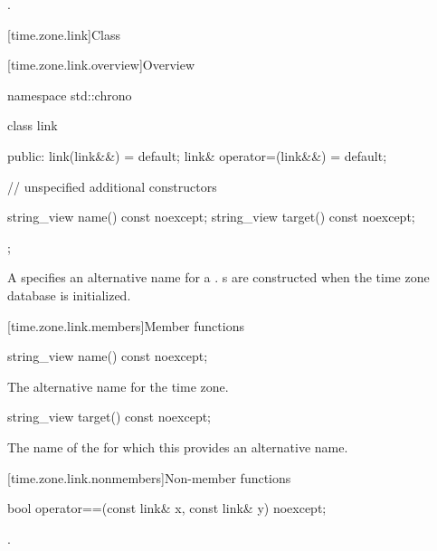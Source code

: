 \begin{itemdescr}
\pnum
\returns
{}.
\end{itemdescr}

[time.zone.link]{Class }

[time.zone.link.overview]{Overview}

\begin{codeblock}
namespace std::chrono {
  class link {
  public:
    link(link&&)            = default;
    link& operator=(link&&) = default;

    // unspecified additional constructors

    string_view name()   const noexcept;
    string_view target() const noexcept;
  };
}
\end{codeblock}

\pnum
A  specifies an alternative name for a .
s are constructed when the time zone database is initialized.

[time.zone.link.members]{Member functions}

%
\begin{itemdecl}
string_view name() const noexcept;
\end{itemdecl}

\begin{itemdescr}
\pnum
\returns
The alternative name for the time zone.
\end{itemdescr}

%
\begin{itemdecl}
string_view target() const noexcept;
\end{itemdecl}

\begin{itemdescr}
\pnum
\returns
The name of the  for which
this  provides an alternative name.
\end{itemdescr}

[time.zone.link.nonmembers]{Non-member functions}

%
\begin{itemdecl}
bool operator==(const link& x, const link& y) noexcept;
\end{itemdecl}

\begin{itemdescr}
\pnum
\returns
{}.
\end{itemdescr}

